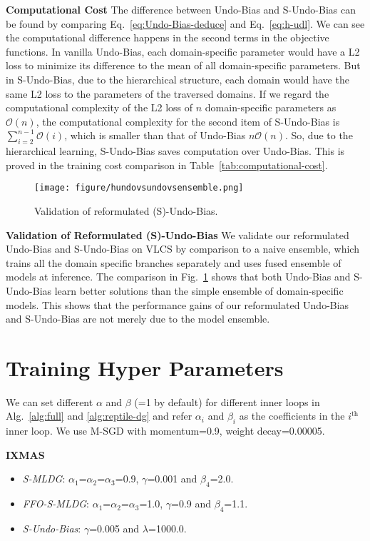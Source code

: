 \documentclass[runningheads]{llncs}
\newcommand{\nameS}{S-MLDG}
\newcommand{\nameFFS}{FFO-\nameS}
\newcommand{\hundo}{S-Undo-Bias}
\newcommand{\keypoint}[1]{\vspace{0.1cm}\noindent\textbf{#1}\quad}
\begin{document}
\keypoint{Computational Cost}
The difference between Undo-Bias and \hundo{} can be found by comparing Eq.~\ref{eq:Undo-Bias-deduce} and Eq.~\ref{eq:h-udl}. We can see the computational difference happens in the second terms in the objective functions. In vanilla Undo-Bias, each domain-specific parameter would have a L2 loss to minimize its difference to the mean of all domain-specific parameters. But in \hundo, due to the hierarchical structure, each domain would have the same L2 loss to the parameters of the traversed domains. If we regard the computational complexity of the L2 loss of $n$ domain-specific parameters as $\mathcal{O}(n)$, the computational complexity for the second item of \hundo{} is $\sum_{i=2}^{n-1} \mathcal{O}(i)$, which is smaller than that of Undo-Bias $ n\mathcal{O}(n)$. So, due to the hierarchical learning, \hundo{} saves computation over Undo-Bias. This is proved in the training cost comparison in Table~\ref{tab:computational-cost}.

\begin{figure}[t]
    \centering
    \centering
    \texttt{[image: figure/hundovsundovsensemble.png]}
\caption{Validation of reformulated (S)-Undo-Bias.}
    \label{fig:hundo-vs-naive}
\end{figure}

\keypoint{Validation of Reformulated (S)-Undo-Bias} We validate our reformulated Undo-Bias and \hundo{} on VLCS by comparison to a naive ensemble, which trains all the domain specific branches separately and uses fused ensemble of models at inference. The comparison in Fig.~\ref{fig:hundo-vs-naive} shows that both Undo-Bias and \hundo{} learn better solutions than the simple ensemble of domain-specific models. This shows that the performance gains of our reformulated Undo-Bias and \hundo{} are not merely due to the model ensemble.


\section{Training Hyper Parameters}

We can set different $\alpha$ and $\beta$ (=1 by default) for different inner loops in Alg.~\ref{alg:full} and \ref{alg:reptile-dg} and refer $\alpha_i$ and $\beta_i$ as the coefficients in the $i^{\text{th}}$ inner loop.
We use M-SGD with momentum=0.9, weight decay=0.00005.

\keypoint{IXMAS} 
\begin{itemize}
    \item \emph{\nameS{}}: $\alpha_1$=$\alpha_2$=$\alpha_3$=0.9, $\gamma$=0.001 and $\beta_{4}$=2.0.
    \item \emph{\nameFFS{}}: $\alpha_1$=$\alpha_2$=$\alpha_3$=1.0, $\gamma$=0.9 and $\beta_{4}$=1.1.
    \item \emph{\hundo}: $\gamma$=0.005 and $\lambda$=1000.0.
\end{itemize}
\end{document}
